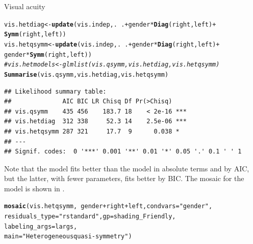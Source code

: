 \documentclass[11pt]{book}\usepackage[]{graphicx}\usepackage[]{color}
\makeatletter
\newcommand{\hlstr}[1]{\textcolor[rgb]{0.192,0.494,0.8}{#1}}%
\newcommand{\hlcom}[1]{\textcolor[rgb]{0.678,0.584,0.686}{\textit{#1}}}%
\newcommand{\hlopt}[1]{\textcolor[rgb]{0,0,0}{#1}}%
\newcommand{\hlstd}[1]{\textcolor[rgb]{0.345,0.345,0.345}{#1}}%
\newcommand{\hlkwb}[1]{\textcolor[rgb]{0.69,0.353,0.396}{#1}}%
\newcommand{\hlkwc}[1]{\textcolor[rgb]{0.333,0.667,0.333}{#1}}%
\newcommand{\hlkwd}[1]{\textcolor[rgb]{0.737,0.353,0.396}{\textbf{#1}}}%
\newenvironment{kframe}{%
 \def\at@end@of@kframe{}%
 \ifinner\ifhmode%
  \def\at@end@of@kframe{\end{minipage}}%
  \begin{minipage}{\columnwidth}%
 \fi\fi%
 \def\FrameCommand##1{\hskip\@totalleftmargin \hskip-\fboxsep
 \colorbox{shadecolor}{##1}\hskip-\fboxsep
     \hskip-\linewidth \hskip-\@totalleftmargin \hskip\columnwidth}%
 \MakeFramed {\advance\hsize-\width
   \@totalleftmargin\z@ \linewidth\hsize
   \@setminipage}}%
 {\par\unskip\endMakeFramed%
 \at@end@of@kframe}
\newenvironment{knitrout}{}{} %
\renewenvironment{knitrout}{\small\renewcommand{\baselinestretch}{.85}}{} %
\makeatother
\begin{document}
\begin{Example}{Visual acuity}
\begin{knitrout}
\color{fgcolor}\begin{kframe}
\begin{alltt}
\hlstd{vis.hetdiag} \hlkwb{<-} \hlkwd{update}\hlstd{(vis.indep, .} \hlopt{~} \hlstd{.} \hlopt{+} \hlstd{gender}\hlopt{*}\hlkwd{Diag}\hlstd{(right, left)} \hlopt{+}
                      \hlkwd{Symm}\hlstd{(right, left))}
\hlstd{vis.hetqsymm} \hlkwb{<-} \hlkwd{update}\hlstd{(vis.indep, .} \hlopt{~} \hlstd{.} \hlopt{+} \hlstd{gender}\hlopt{*}\hlkwd{Diag}\hlstd{(right, left)} \hlopt{+}
                       \hlstd{gender}\hlopt{*}\hlkwd{Symm}\hlstd{(right, left))}
\hlcom{#vis.hetmodels <- glmlist(vis.qsymm, vis.hetdiag, vis.hetqsymm)}
\hlkwd{Summarise}\hlstd{(vis.qsymm, vis.hetdiag, vis.hetqsymm)}
\end{alltt}
\begin{verbatim}
## Likelihood summary table:
##              AIC BIC LR Chisq Df Pr(>Chisq)    
## vis.qsymm    435 456    183.7 18    < 2e-16 ***
## vis.hetdiag  312 338     52.3 14    2.5e-06 ***
## vis.hetqsymm 287 321     17.7  9      0.038 *  
## ---
## Signif. codes:  0 '***' 0.001 '**' 0.01 '*' 0.05 '.' 0.1 ' ' 1
\end{verbatim}
\end{kframe}
\end{knitrout}
\noindent Note that the model  fits better than the model 
in absolute terms and by AIC, but the latter, with fewer parameters, fits better by BIC.
The mosaic for the model  is shown in .
\begin{knitrout}
\color{fgcolor}\begin{kframe}
\begin{alltt}
\hlkwd{mosaic}\hlstd{(vis.hetqsymm,} \hlopt{~} \hlstd{gender} \hlopt{+} \hlstd{right} \hlopt{+} \hlstd{left,} \hlkwc{condvars}\hlstd{=}\hlstr{"gender"}\hlstd{,}
       \hlkwc{residuals_type}\hlstd{=}\hlstr{"rstandard"}\hlstd{,} \hlkwc{gp}\hlstd{=shading_Friendly,}
       \hlkwc{labeling_args}\hlstd{=largs,}
       \hlkwc{main}\hlstd{=}\hlstr{"Heterogeneous quasi-symmetry"}\hlstd{)}
\end{alltt}
\end{kframe}\begin{figure}[!htbp]



\end{figure}
\end{knitrout}
\end{Example}
\end{document}
